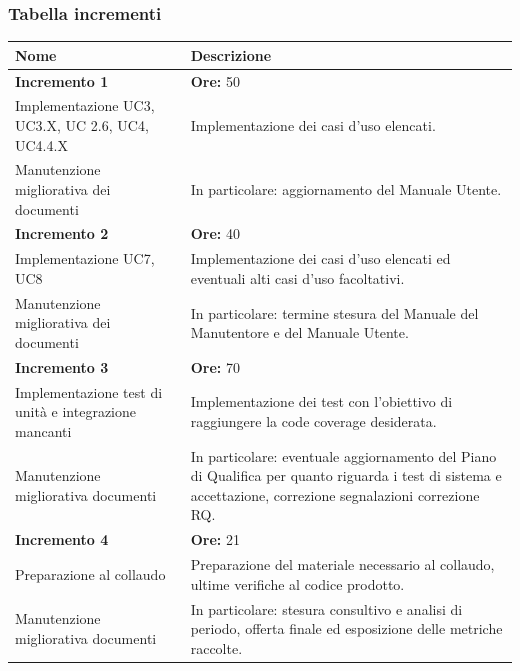 	\subsubsection{Tabella incrementi}
	\begin{longtabu} to \textwidth{| X[0.2, c m] | X[0.4, l m ] |}
		\hline
		\textbf{Nome} & \textbf{Descrizione} \\ 
	 \hline
		 \textbf{Incremento 1} & \textbf{Ore:} 50 \\
	 \hline
	 	Implementazione UC3, UC3.X, UC 2.6, UC4, UC4.4.X &
		Implementazione dei casi d'uso elencati. \\
	 \hline
		Manutenzione migliorativa dei documenti &
		In particolare: aggiornamento del Manuale Utente. \\
	 \hline
		 \textbf{Incremento 2} & \textbf{Ore:} 40 \\
	 \hline
	 	Implementazione UC7, UC8 &
		Implementazione dei casi d'uso elencati ed eventuali alti casi d'uso facoltativi. \\
	 \hline
		Manutenzione migliorativa dei documenti &
		In particolare: termine stesura del Manuale del Manutentore e del Manuale Utente. \\
	 \hline
	 	\textbf{Incremento 3} & \textbf{Ore:} 70 \\
	 \hline
		Implementazione test di unità e integrazione mancanti &
		Implementazione dei test con l'obiettivo di raggiungere la code coverage desiderata. \\
	 \hline
		 Manutenzione migliorativa documenti &
		 In particolare: eventuale aggiornamento del Piano di Qualifica per quanto riguarda i test di sistema e accettazione, correzione segnalazioni correzione RQ. \\
	 \hline
	 \textbf{Incremento 4} & \textbf{Ore:} 21\\
	 \hline
		 Preparazione al collaudo &
		 Preparazione del materiale necessario al collaudo, ultime verifiche al codice prodotto. \\
	 \hline
		 Manutenzione migliorativa documenti &
		 In particolare: stesura consultivo e analisi di periodo, offerta finale ed esposizione delle metriche raccolte. \\
	 \hline
 \end{longtabu}
 